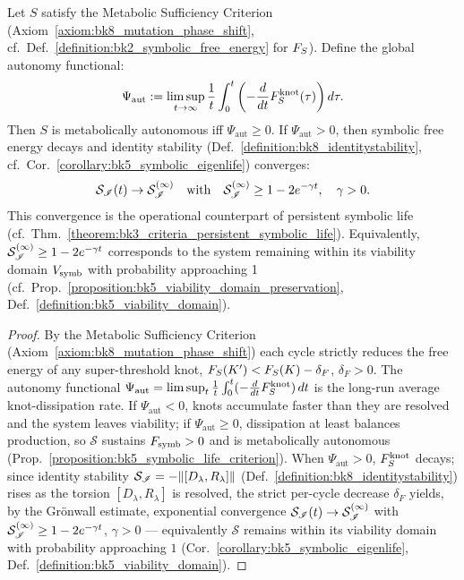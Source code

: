 \begin{theorem}
\label{theorem:bk8_biological_phase_transition}
Let $S$ satisfy the Metabolic Sufficiency Criterion (Axiom~\ref{axiom:bk8_mutation_phase_shift}, cf.~Def.~\ref{definition:bk2_symbolic_free_energy} for $F_S$). Define the global autonomy functional:
\[
\Psi_{\mathrm{aut}} := \limsup_{t \to \infty} \frac{1}{t} \int_0^t \left( -\frac{d}{dt} F_S^{\text{knot}}(\tau) \right) d\tau.
\]
Then $S$ is metabolically autonomous iff $\Psi_{\mathrm{aut}} \ge 0$. If $\Psi_{\mathrm{aut}} > 0$, then symbolic free energy decays and identity stability (Def.~\ref{definition:bk8_identitystability}, cf.~Cor.~\ref{corollary:bk5_symbolic_eigenlife}) converges:
\[
\mathcal{S}_{\mathscr{I}}(t) \to \mathcal{S}_{\mathscr{I}}^{(\infty)} \quad \text{with} \quad \mathcal{S}_{\mathscr{I}}^{(\infty)} \ge 1 - 2e^{-\gamma t}, \quad \gamma > 0.
\]
This convergence is the operational counterpart of persistent symbolic life (cf.~Thm.~\ref{theorem:bk3_criteria_persistent_symbolic_life}). Equivalently, $\mathcal{S}_{\mathscr{I}}^{(\infty)} \ge 1-2e^{-\gamma t}$ corresponds to the system remaining within its viability domain $V_{\mathrm{symb}}$ with probability approaching 1 (cf.~Prop.~\ref{proposition:bk5_viability_domain_preservation}, Def.~\ref{definition:bk5_viability_domain}).
\end{theorem}
\begin{proof}
\label{proof:bk8_biological_phase_transition}
\leavevmode
By the Metabolic Sufficiency Criterion (Axiom~\ref{axiom:bk8_mutation_phase_shift}) each cycle strictly reduces the free energy of any super-threshold knot, $F_S(K')<F_S(K)-\delta_F$, $\delta_F>0$. The autonomy functional $\Psi_{\mathrm{aut}}=\limsup_{t}\tfrac1t\int_0^t(-\tfrac{d}{dt}F_S^{\text{knot}})\,dt$ is the long-run average knot-dissipation rate. If $\Psi_{\mathrm{aut}}<0$, knots accumulate faster than they are resolved and the system leaves viability; if $\Psi_{\mathrm{aut}}\ge 0$, dissipation at least balances production, so $\mathcal{S}$ sustains $F_{\mathrm{symb}}>0$ and is metabolically autonomous (Prop.~\ref{proposition:bk5_symbolic_life_criterion}). When $\Psi_{\mathrm{aut}}>0$, $F_S^{\text{knot}}$ decays; since identity stability $\mathcal{S}_{\mathscr{I}}=-\|[D_\lambda,R_\lambda]\|$ (Def.~\ref{definition:bk8_identitystability}) rises as the torsion $[D_\lambda,R_\lambda]$ is resolved, the strict per-cycle decrease $\delta_F$ yields, by the Grönwall estimate, exponential convergence $\mathcal{S}_{\mathscr{I}}(t)\to\mathcal{S}_{\mathscr{I}}^{(\infty)}$ with $\mathcal{S}_{\mathscr{I}}^{(\infty)}\ge 1-2e^{-\gamma t}$, $\gamma>0$ --- equivalently $\mathcal{S}$ remains within its viability domain with probability approaching $1$ (Cor.~\ref{corollary:bk5_symbolic_eigenlife}, Def.~\ref{definition:bk5_viability_domain}).
\end{proof}
